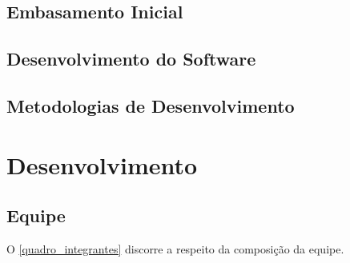 \documentclass[
	article,			%
	12pt,				%
	oneside,			%
	a4paper,			%
    BIBLATEX,           %
	english,			%
	brazil,				%
	sumario=tradicional
	]{abntex2}
\begin{document}
\subsection{Embasamento Inicial}

\subsection{Desenvolvimento do Software}

\subsection{Metodologias de Desenvolvimento}

\section{Desenvolvimento}

\subsection{Equipe}

O \autoref{quadro_integrantes} discorre a respeito da composição da equipe.
\end{document}
